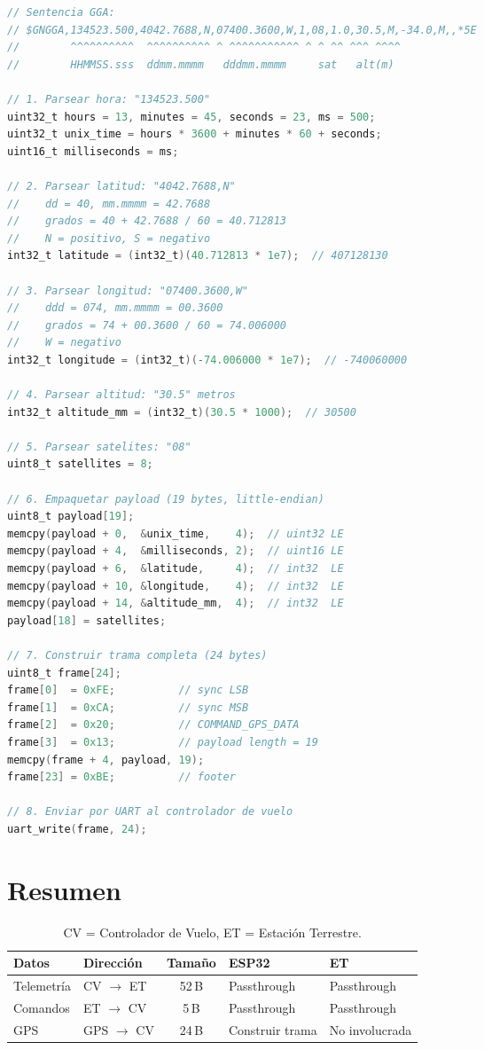 \documentclass[11pt,a4paper]{article}
\begin{document}
\begin{lstlisting}[language=C, caption={ESP32: parsear GGA y construir trama GPS.}]
// Sentencia GGA:
// $GNGGA,134523.500,4042.7688,N,07400.3600,W,1,08,1.0,30.5,M,-34.0,M,,*5E
//        ^^^^^^^^^^  ^^^^^^^^^^ ^ ^^^^^^^^^^^ ^ ^ ^^ ^^^ ^^^^
//        HHMMSS.sss  ddmm.mmmm   dddmm.mmmm     sat   alt(m)

// 1. Parsear hora: "134523.500"
uint32_t hours = 13, minutes = 45, seconds = 23, ms = 500;
uint32_t unix_time = hours * 3600 + minutes * 60 + seconds;
uint16_t milliseconds = ms;

// 2. Parsear latitud: "4042.7688,N"
//    dd = 40, mm.mmmm = 42.7688
//    grados = 40 + 42.7688 / 60 = 40.712813
//    N = positivo, S = negativo
int32_t latitude = (int32_t)(40.712813 * 1e7);  // 407128130

// 3. Parsear longitud: "07400.3600,W"
//    ddd = 074, mm.mmmm = 00.3600
//    grados = 74 + 00.3600 / 60 = 74.006000
//    W = negativo
int32_t longitude = (int32_t)(-74.006000 * 1e7);  // -740060000

// 4. Parsear altitud: "30.5" metros
int32_t altitude_mm = (int32_t)(30.5 * 1000);  // 30500

// 5. Parsear satelites: "08"
uint8_t satellites = 8;

// 6. Empaquetar payload (19 bytes, little-endian)
uint8_t payload[19];
memcpy(payload + 0,  &unix_time,    4);  // uint32 LE
memcpy(payload + 4,  &milliseconds, 2);  // uint16 LE
memcpy(payload + 6,  &latitude,     4);  // int32  LE
memcpy(payload + 10, &longitude,    4);  // int32  LE
memcpy(payload + 14, &altitude_mm,  4);  // int32  LE
payload[18] = satellites;

// 7. Construir trama completa (24 bytes)
uint8_t frame[24];
frame[0]  = 0xFE;          // sync LSB
frame[1]  = 0xCA;          // sync MSB
frame[2]  = 0x20;          // COMMAND_GPS_DATA
frame[3]  = 0x13;          // payload length = 19
memcpy(frame + 4, payload, 19);
frame[23] = 0xBE;          // footer

// 8. Enviar por UART al controlador de vuelo
uart_write(frame, 24);
\end{lstlisting}

\section{Resumen}

\begin{table}[h]
\centering
\begin{tabular}{@{}llcll@{}}
\toprule
\textbf{Datos} & \textbf{Dirección} & \textbf{Tamaño} & \textbf{ESP32} & \textbf{ET} \\
\midrule
Telemetría & CV $\rightarrow$ ET & 52\,B & Passthrough & Passthrough \\
Comandos   & ET $\rightarrow$ CV & 5\,B  & Passthrough & Passthrough \\
GPS        & GPS $\rightarrow$ CV & 24\,B & Construir trama & No involucrada \\
\bottomrule
\end{tabular}
\caption{CV = Controlador de Vuelo, ET = Estación Terrestre.}
\end{table}
\end{document}
